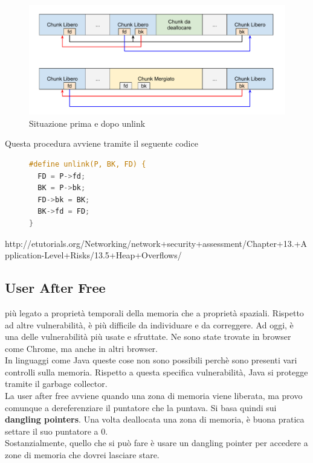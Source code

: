 \documentclass[a4paper,12pt]{article}
\begin{document}
\begin{figure}[H]
	\centering
	\includegraphics[width=\linewidth]{Immagini/Unlink}
	\caption{Situazione prima e dopo unlink}
\end{figure}

Questa procedura avviene tramite il seguente codice

\begin{figure}[H]
\begin{lstlisting}[language=C]
#define unlink(P, BK, FD) {
  FD = P->fd;
  BK = P->bk;
  FD->bk = BK;
  BK->fd = FD;
}
\end{lstlisting}
\end{figure}

http://etutorials.org/Networking/network+security+assessment/Chapter+13.+Application-Level+Risks/13.5+Heap+Overflows/

\subsection{User After Free}
\E più legato a proprietà temporali della memoria che a proprietà spaziali. Rispetto ad altre vulnerabilità, è più difficile da individuare e da correggere. Ad oggi, è una delle vulnerabilità più usate e sfruttate. Ne sono state trovate in browser come Chrome, ma anche in altri browser.\\
In linguaggi come Java queste cose non sono possibili perchè sono presenti vari controlli sulla memoria. Rispetto a questa specifica vulnerabilità, Java si protegge tramite il garbage collector.\\
La user after free avviene quando una zona di memoria viene liberata, ma provo comunque a dereferenziare il puntatore che la puntava. Si basa quindi sui \textbf{dangling pointers}. Una volta deallocata una zona di memoria, è buona pratica settare il suo puntatore a 0.\\
Sostanzialmente, quello che si può fare è usare un dangling pointer per accedere a zone di memoria che dovrei lasciare stare.
\end{document}
